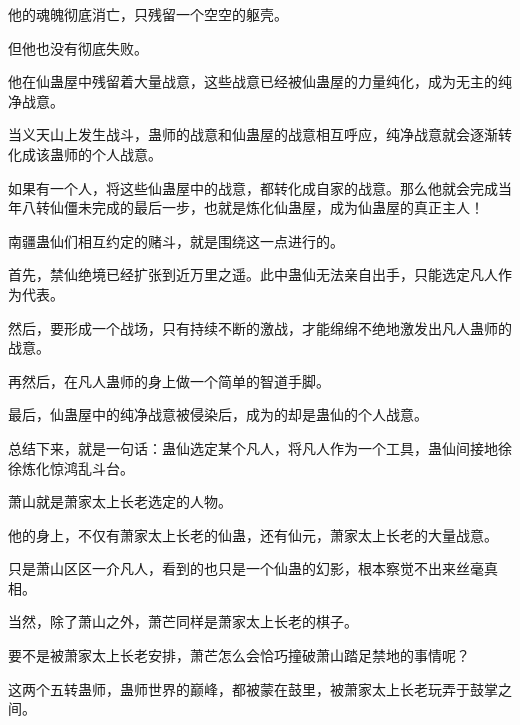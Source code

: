 \begin{this_body}
他的魂魄彻底消亡，只残留一个空空的躯壳。

但他也没有彻底失败。

他在仙蛊屋中残留着大量战意，这些战意已经被仙蛊屋的力量纯化，成为无主的纯净战意。

当义天山上发生战斗，蛊师的战意和仙蛊屋的战意相互呼应，纯净战意就会逐渐转化成该蛊师的个人战意。

如果有一个人，将这些仙蛊屋中的战意，都转化成自家的战意。那么他就会完成当年八转仙僵未完成的最后一步，也就是炼化仙蛊屋，成为仙蛊屋的真正主人！

南疆蛊仙们相互约定的赌斗，就是围绕这一点进行的。

首先，禁仙绝境已经扩张到近万里之遥。此中蛊仙无法亲自出手，只能选定凡人作为代表。

然后，要形成一个战场，只有持续不断的激战，才能绵绵不绝地激发出凡人蛊师的战意。

再然后，在凡人蛊师的身上做一个简单的智道手脚。

最后，仙蛊屋中的纯净战意被侵染后，成为的却是蛊仙的个人战意。

总结下来，就是一句话：蛊仙选定某个凡人，将凡人作为一个工具，蛊仙间接地徐徐炼化惊鸿乱斗台。

萧山就是萧家太上长老选定的人物。

他的身上，不仅有萧家太上长老的仙蛊，还有仙元，萧家太上长老的大量战意。

只是萧山区区一介凡人，看到的也只是一个仙蛊的幻影，根本察觉不出来丝毫真相。

当然，除了萧山之外，萧芒同样是萧家太上长老的棋子。

要不是被萧家太上长老安排，萧芒怎么会恰巧撞破萧山踏足禁地的事情呢？

这两个五转蛊师，蛊师世界的巅峰，都被蒙在鼓里，被萧家太上长老玩弄于鼓掌之间。

\end{this_body}

